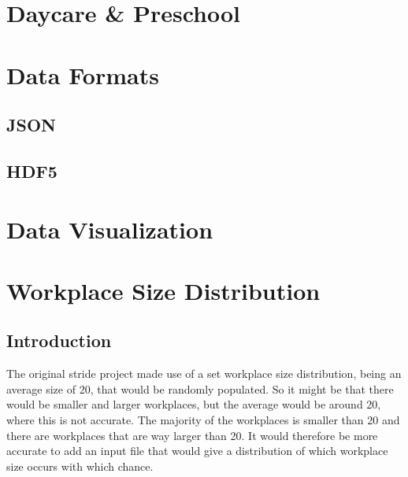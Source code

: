 \documentclass[runningheads]{llncs}
\begin{document}
	\section{Daycare \& Preschool}
	\section{Data Formats}
	\subsection{JSON}
	\subsection{HDF5}
	\section{Data Visualization}
	\section{Workplace Size Distribution}
	\subsection{Introduction}
	The original stride project made use of a set workplace size distribution, being an average size of 20, that would be randomly populated. So it might be that there would be smaller and larger workplaces, but the average would be around 20, where this is not accurate. The majority of the workplaces is smaller than 20 and there are workplaces that are way larger than 20. It would therefore be more accurate to add an input file that would give a distribution of which workplace size occurs with which chance.
\end{document}
